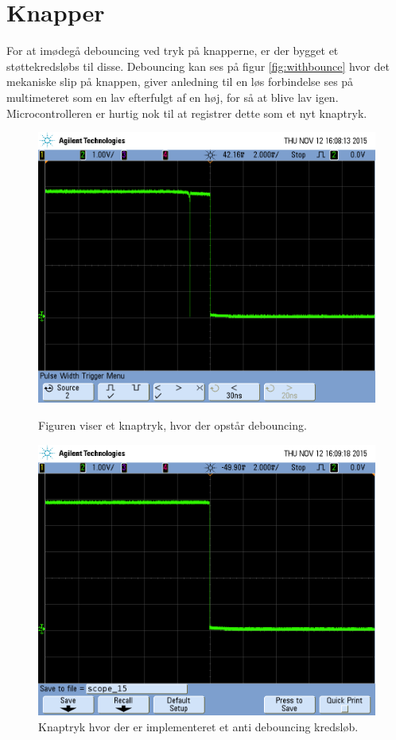 \section{Knapper} \label{title:buttons}
For at imødegå debouncing ved tryk på knapperne, er der bygget et støttekredsløbs til disse. Debouncing kan ses på figur \ref{fig:withbounce} hvor det mekaniske slip på knappen, giver anledning til en løs forbindelse ses på multimeteret som en lav efterfulgt af en høj, for så at blive lav igen. Microcontrolleren er hurtig nok til at registrer dette som et nyt knaptryk.
\begin{figure}[H]
	\begin{minipage}{0.50\textwidth}
		\includegraphics[width = \textwidth]{Implementeringsdokument/billeder/scope_14.png}
		\caption{Figuren viser et knaptryk, hvor der opstår debouncing.}\label{fig:withbounce}
	\end{minipage}
	\begin{minipage}{0.50\textwidth}
		\includegraphics[width = \textwidth]{Implementeringsdokument/billeder/scope_15.png}
		\caption{Knaptryk hvor der er implementeret et anti debouncing kredsløb.}\label{fig:withoutbounce}
	\end{minipage}
\end{figure}

